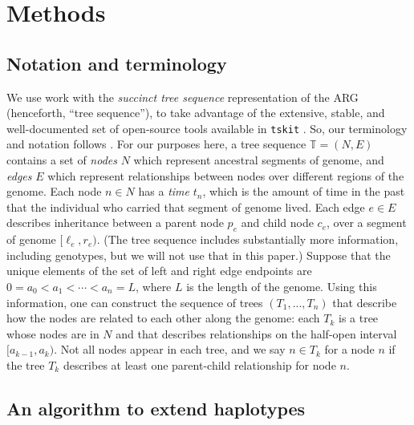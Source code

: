 \documentclass[10pt,twoside,lineno]{gsajnl}
\newcommand{\T}{\mathbb{T}}
\newcommand{\tskit}{\texttt{tskit}}
\begin{document}
\section{Methods}

\subsection{Notation and terminology}

We use work with the \emph{succinct tree sequence} representation of the ARG (henceforth, ``tree sequence''),
to take advantage of the extensive, stable, and well-documented set of open-source tools
available in \tskit{} \citep{tskit}.
So, our terminology and notation follows \citet{ralph2020efficiently}.
For our purposes here,
a tree sequence $\T = (N, E)$ contains a set of \emph{nodes} $N$ 
which represent ancestral segments of genome,
and \emph{edges} $E$ which represent relationships between nodes over different regions of the genome.
Each node $n \in N$ has a \emph{time} $t_n$,
which is the amount of time in the past that the individual who carried that segment of genome lived.
Each edge $e \in E$ describes inheritance between a parent node $p_e$ and child node $c_e$,
over a segment of genome $[\ell_e, r_e)$.
(The tree sequence includes substantially more information, including genotypes, but we will not use that in this paper.)
Suppose that the unique elements of the set of left and right edge endpoints
are $0 = a_0 < a_1 < \cdots < a_{n} = L$, where $L$ is the length of the genome.
Using this information, one can construct the sequence of 
trees $\left(T_1,...,T_{n}\right)$ that describe how the nodes are related to each other along the genome:
each $T_k$ is a tree whose nodes are in $N$
and that describes relationships on the half-open interval $[a_{k-1}, a_k)$.
Not all nodes appear in each tree,
and we say $n \in T_k$ for a node $n$ if the tree $T_k$ describes at least one parent-child relationship
for node $n$.

\subsection{An algorithm to extend haplotypes}
\end{document}
